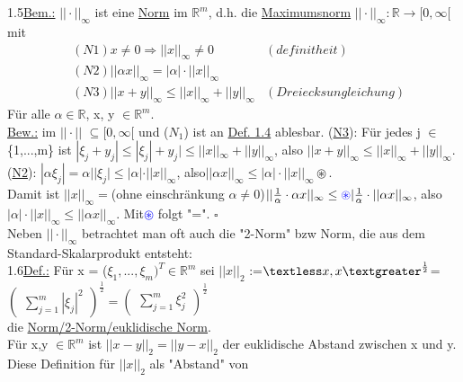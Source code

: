\documentclass[11pt]{article}
\begin{document}
	\\\\
	1.5\underline{Bem.:} $||\cdot||_\infty$ ist eine \ul{Norm} im $\mathbb{R}^m$, d.h. die \ul{Maximumsnorm} $||\cdot||_\infty:\mathbb{R}\rightarrow[0,\infty[$\\
	mit\begin{align}
		&(N1) x \neq0\Rightarrow||x||_\infty\neq0 &(definitheit)\nonumber\\
		&(N2) ||\alpha x||_\infty= |\alpha|\cdot||x||_\infty\nonumber\\
		&(N3) ||x+y||_\infty \leq || x ||_\infty + ||y||_\infty & (Dreiecksungleichung)\nonumber
	\end{align} 
	Für alle $\alpha \in \mathbb{R}$, x, y $\in \mathbb{R}^m$.\\
	\underline{Bew.:}  im $||\cdot||$ $\subseteq [0,\infty[$ und 
	(\ul{$N_1$}) ist an  \ul{Def. 1.4} 
	ablesbar.  (\ul{N3}): Für jedes j $\in$ \{1,...,m\} ist 
	$|\xi_j + y_j| \leq|\xi_j|+y_j|\leq ||x||_\infty +||y||_\infty$, also 
	$||x+y||_\infty \leq ||x||_\infty + ||y||_\infty.$\\
	(\ul{N2}): $| \alpha \xi_j| = \alpha| |\xi_j| \leq |\alpha|\cdot 
	||x||_\infty$, also$||\alpha x ||_\infty \leq |\alpha|\cdot||x||_\infty 
	\circledast$.\\
	Damit ist $||x||_\infty = $(ohne einschränkung $\alpha \neq 0$)$|| 
	\frac{1}{\alpha}\cdot \alpha x||_\infty \leq\textcolor{blue}{\circledast} 
	|\frac{1}{\alpha} 
	\cdot||\alpha x ||_\infty$, also $|\alpha| \cdot ||x||_\infty \leq ||\alpha 
	x||_\infty$. Mit\textcolor{blue}{$\circledast$} folgt "=". $\square$ \\
	Neben $||\cdot||_\infty$ betrachtet man oft auch die "2-Norm" bzw Norm, die 
	aus dem Standard-Skalarprodukt entsteht:\\
	1.6\underline{Def.:} Für x = ($\xi_1,...,\xi_m)^T\in\mathbb{R}^m$ sei 
	$||x||_2$ :=$\textless x,x \textgreater^{\frac{1}{2}}$=
	$\begin{pmatrix} 
		\sum_{j=1}^{m}|\xi_j|^2
	\end{pmatrix}^{\frac{1}{2}}
	=
	\begin{pmatrix} 
		\sum_{j=1}^{m}\xi_j^2
	\end{pmatrix}^{\frac{1}{2}}$
	\\
	die  \ul{Norm/2-Norm/euklidische Norm}.\\
	Für x,y $\in \mathbb{R}^m$ ist $||x-y||_2 = ||y-x||_2$ der euklidische 
	Abstand zwischen x und y. Diese Definition für $||x||_2$ als "Abstand" von 
\end{document}
